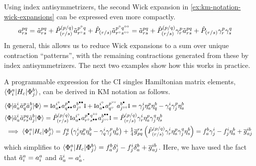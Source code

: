 \documentclass[11pt]{article}
\numberwithin{equation}{section}
\begin{document}
\begin{ex}
Using index antisymmetrizers, the second Wick expansion in \cref{ex:km-notation-wick-expansions} can be expressed even more compactly.
\begin{align*}
  a^{pq}_{rs}
=&\
  \tilde{a}^{pq}_{rs}
+
  \hat{P}^{(p/q)}_{(r/s)}
  \tilde{a}^{p^\circ q}_{r^\circ s}
+
  \hat{P}_{(r/s)}
  \tilde{a}^{p^\circ q^{\circ\circ}}_{r^\circ s^{\circ\circ}}
=
  \tilde{a}^{pq}_{rs}
+
  \hat{P}^{(p/q)}_{(r/s)}
  \gamma ^p_r
  \tilde{a}^{pq}_{rs}
+
  \hat{P}_{(r/s)}
  \gamma ^p_r
  \gamma ^q_s
\end{align*}
In general, this allows us to reduce Wick expansions to a sum over unique contraction ``patterns'', with the remaining contractions generated from these by index antisymmetrizers.
The next two examples show how this works in practice.
\end{ex}



\begin{ex}
A programmable expression for the CI singles Hamiltonian matrix elements, $\langle\Phi _i^a|H_c|\Phi _j^b\rangle$,  can be derived in KM notation as follows.
\begin{align*}
&
  \ip{\F|\tl{a}_a^i\tl{a}_q^p\tl{a}_j^b|\F}
=
  \gno{
    a_{a^\ptcl}^{i^\hole}
    a_{q^{\ptcl\ptcl}}^{p^\ptcl}
    a_{j^\hole}^{b^{\ptcl\ptcl}}
  }
+
  \gno{
    a_{a^\ptcl}^{i^{\hole}}
    a_{q^{\hole}}^{p^{\hole\hole}}
    a_{j^{\hole\hole}}^{b^{\ptcl}}
  }
=
  \g^i_j\h_a^p\h_q^b
-
  \g_q^i\g_j^p\h_a^b
\\
&
  \ip{\F|\tl{a}_a^i\tl{a}^{pq}_{rs}\tl{a}_j^b|\F}
=
  \op{P}^{(p/q)}_{(r/s)}
  \gno{
    a^{i^\hole}_{a^\ptcl}
    a^{p^\ptcl q^{\hole\hole}}_{r^\hole s^{\ptcl\ptcl}}
    a^{b^{\ptcl\ptcl}}_{j^{\hole\hole}}
  }
=
  \op{P}^{(p/q)}_{(r/s)}
  \g^i_r\h^p_a\g^q_j\h^b_s
\\
&
\implies
  \ip{\F_i^a|H_\mr{c}|\F_j^b}
=
  f_p^q\pr{
    \g^i_j\h_a^p\h_q^b
  -
    \g_q^i\g_j^p\h_a^b
  }
+
  \tfr{1}{4}
  \ol{g}_{pq}^{rs}\pr{
    \op{P}^{(p/q)}_{(r/s)}
    \g^i_r\h^p_a\g^q_j\h^b_s
  }
=
  f_a^b\g_j^i
-
  f_j^i\h_a^b
+
  \ol{g}^{ib}_{aj}
\end{align*}
which simplifies to
$\langle\Phi _i^a|H_{\mathrm{c}}|\Phi _j^b\rangle=f_a^b\delta _j^i-f_j^i\delta _a^b+\overline{g}^{ib}_{aj}$.
Here, we have used the fact that $\tilde{a}_i^a=a_i^a$ and $\tilde{a}_a^i=a_a^i$.
\end{ex}
\end{document}

